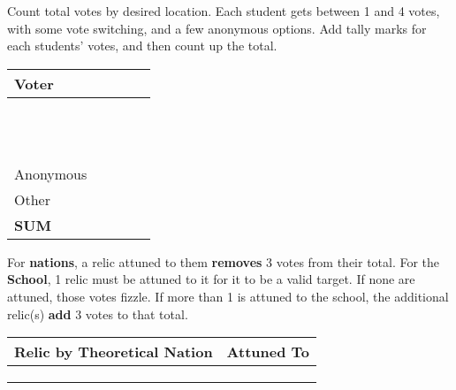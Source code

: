 \documentclass[green]{GL2020}
\begin{document}
\name{\gTallyingVotes{}}

Count total votes by desired location. Each student gets between 1 and 4 votes, with some vote switching, and a few anonymous options. Add tally marks for each students' votes, and then count up the total.

\begin{tabularx}{\textwidth}{|>{\centering\arraybackslash}X |>{\centering\arraybackslash}X | >{\centering\arraybackslash}X | >{\centering\arraybackslash} m{2cm} | >{\centering\arraybackslash}X |}
\hline
	\textbf{Voter} & \textbf{\pFarm{}}  & \textbf{\pTech{}} & \textbf{\pShip{}} & \textbf{\pSchool{}} \\
\hline
\hline
	\cLibAssist{}	&	&	&	&  \\
\hline	
	\cChupStudent{}	&	&	&	&	 \\
\hline
	\cAdopted{}	&	&	&	&	 \\
\hline
	\cDisney{}	&	&	&	&	 \\
\hline
	\cTechStar{}	&	&	&	&	 \\
\hline
	\cAmbition{}	&	&	&	&	 \\
\hline
	\cHeir{}	&	&	&	&	 \\
\hline
	\cScholarship{}	&	&	&	&	 \\
\hline
	\cPresident{}	&	&	&	&	 \\
\hline
	\cInitiate{}	&	&	&	&	 \\
\hline
	\cPirateChild{}	&	&	&	&	 \\
\hline
	\cWarlordDaughter{}	&	&	&	&	 \\
\hline
	Anonymous	&	&	&	&	 \\
\hline
	Other	&	&	&	&	 \\
\hline
\hline
	\textbf{SUM}	&	&	&	&	 \\
\hline
\end{tabularx}

For \textbf{nations}, a relic attuned to them \textbf{removes} 3 votes from their total. For the \textbf{School}, 1 relic must be attuned to it for it to be a valid target. If none are attuned, those votes fizzle. If more than 1 is attuned to the school, the additional relic(s) \textbf{add} 3 votes to that total.

\begin{tabularx}{\textwidth}{|>{\centering\arraybackslash}X |>{\centering\arraybackslash} m{6cm} |}
\hline
	\textbf{Relic by Theoretical Nation} & \textbf{Attuned To} \\
\hline
\hline
	\pFarm{}	&	\\
\hline
	\pTech{}	&	\\
\hline
	\pShip{}	&	\\
\hline
\end{tabularx}
\end{document}
